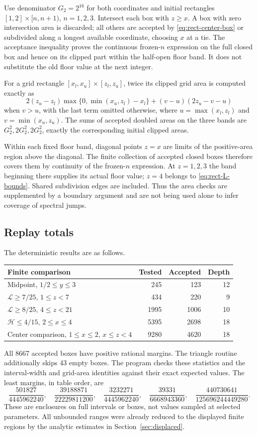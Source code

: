 \documentclass[11pt,reqno]{amsart}
\numberwithin{equation}{section}
\begin{document}
Use denominator $G_2=2^{16}$ for both coordinates and initial
rectangles $[1,2]\times[n,n+1)$, $n=1,2,3$. Intersect
each box with $z\ge x$. A box with zero intersection area is
discarded; all others are accepted by
\eqref{eq:rect-center-box} or subdivided along a longest
available coordinate, choosing $x$ at a tie.
The acceptance inequality proves the continuous frozen-$n$
expression on the full closed box and hence on its clipped
part within the half-open floor band. It does not substitute
the old floor value at the next integer.

For a grid rectangle $[x_l,x_u]\times[z_l,z_u]$, twice its
clipped grid area is computed exactly as
\[
 2(z_u-z_l)\max\{0,\min(x_u,z_l)-x_l\}
 +(v-u)(2z_u-v-u)
\]
when $v>u$, with the last term omitted otherwise, where
$u=\max(x_l,z_l)$ and $v=\min(x_u,z_u)$.
The sums of accepted doubled areas on the three bands are
$G_2^2,2G_2^2,2G_2^2$, exactly the corresponding initial
clipped areas.

Within each fixed floor band, diagonal points $z=x$ are
limits of the positive-area region above the diagonal.
The finite collection of accepted closed boxes therefore
covers them by continuity of the frozen-$n$ expression.
At $z=1,2,3$ the band beginning there supplies its actual
floor value; $z=4$ belongs to \eqref{eq:rect-L-bounds}.
Shared subdivision edges are included. Thus the area checks
are supplemented by a boundary argument and are not being
used alone to infer coverage of spectral jumps.

\subsection*{Replay totals}

The deterministic results are as follows.
\begin{center}
\small
\begin{tabular}{@{}lrrr@{}}
\toprule
Finite comparison & Tested & Accepted & Depth\\
\midrule
Midpoint, $1/2\le y\le3$ & 245 & 123 & 12\\
$\mathcal L\ge7/25$, $1\le z<7$ & 434 & 220 & 9\\
$\mathcal L\ge8/25$, $4\le z<21$ & 1995 & 1006 & 10\\
$\mathcal H\le4/15$, $2\le x\le4$ & 5395 & 2698 & 18\\
Center comparison, $1\le x\le2$, $x\le z<4$ & 9280 & 4620 & 18\\
\bottomrule
\end{tabular}
\end{center}
All 8667 accepted boxes have positive rational margins.
The triangle routine additionally skips 43 empty boxes.
The program checks these statistics and the interval-width
and grid-area identities against their exact expected values.
The least margins, in table order, are
\[
 \frac{501827}{4445962240},\quad
 \frac{39188871}{22229811200},\quad
 \frac{3232271}{4445962240},\quad
 \frac{39331}{6668943360},\quad
 \frac{440730641}{125696244449280}.
\]
These are enclosures on full intervals or boxes, not values
sampled at selected parameters. All unbounded ranges were
already reduced to the displayed finite regions by the
analytic estimates in Section~\ref{sec:displaced}.
\end{document}
